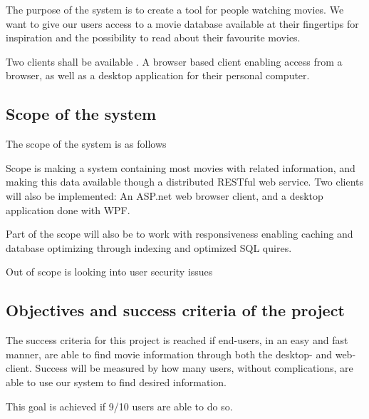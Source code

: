 The purpose of the system is to create a tool for people watching movies. We want to give our users access to a movie database available at their fingertips for inspiration and the possibility to read about their favourite movies.

Two clients shall be available . A browser based client enabling access from a browser, as well as a desktop application for their personal computer.  




\subsection{Scope of the system}

The scope of the system is as follows

Scope is making a system containing most movies with related information, and making this data available though a distributed RESTful web service. Two clients will also be implemented: An ASP.net web browser client, and a desktop application done with WPF.

Part of the scope will also be to work with responsiveness enabling caching and database optimizing through indexing and optimized SQL quires.

Out of scope is looking into user security issues


\subsection{Objectives and success criteria of the project}

The success criteria for this project is reached if end-users, in an easy and fast manner, are able to find movie information through both the desktop- and web-client. Success will be measured by how many users, without complications, are able to use our system to find desired information.

This goal is achieved if 9/10 users are able to do so.


